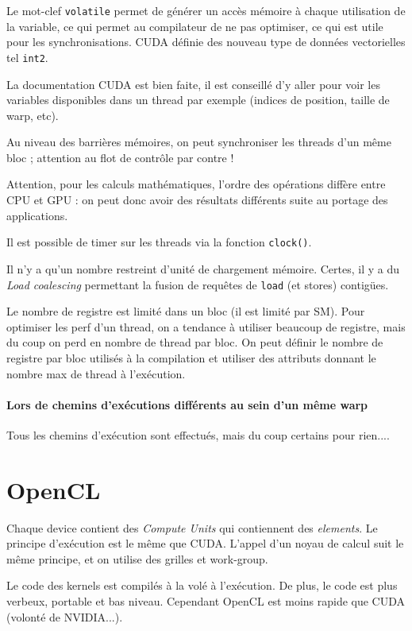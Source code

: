 \documentclass{article}
\begin{document}
Le mot-clef \texttt{volatile} permet de générer un accès mémoire à chaque utilisation de la variable, ce qui permet au compilateur de ne pas optimiser, ce qui est utile pour les synchronisations. CUDA définie des nouveau type de données vectorielles tel \texttt{int2}.

La documentation CUDA est bien faite, il est conseillé d'y aller pour voir les variables disponibles dans un thread par exemple (indices de position, taille de warp, etc).

Au niveau des barrières mémoires, on peut synchroniser les threads d'un même bloc ; attention au flot de contrôle par contre !


Attention, pour les calculs mathématiques, l'ordre des opérations diffère entre CPU et GPU : on peut donc avoir des résultats différents suite au portage des applications.


Il est possible de timer sur les threads via la fonction \texttt{clock()}.

Il n'y a qu'un nombre restreint d'unité de chargement mémoire. Certes, il y a du \emph{Load coalescing} permettant la fusion de requêtes de \texttt{load} (et stores) contigües.

Le nombre de registre est limité dans un bloc (il est limité par SM). Pour optimiser les perf d'un thread, on a tendance à utiliser beaucoup de registre, mais du coup on perd en nombre de thread par bloc. On peut définir le nombre de registre par bloc utilisés à la compilation et utiliser des attributs donnant le nombre max de thread à l'exécution.


\paragraph{Lors de chemins d'exécutions différents au sein d'un même warp} Tous les chemins d'exécution sont effectués, mais du coup certains pour rien....

\section{OpenCL}
Chaque device contient des \emph{Compute Units} qui contiennent des \emph{elements}. Le principe d'exécution est le même que CUDA. L'appel d'un noyau de calcul suit le même principe, et on utilise des grilles et work-group.

Le code des kernels est compilés à la volé à l'exécution. De plus, le code est plus verbeux, portable et bas niveau. Cependant OpenCL est moins rapide que CUDA (volonté de NVIDIA...).
\end{document}
